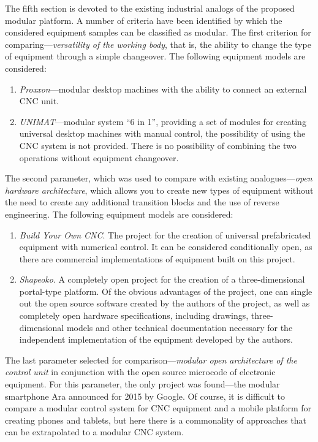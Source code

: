 The fifth section is devoted to the existing industrial analogs of the proposed modular platform. A number of criteria have been identified by which the considered equipment samples can be classified as modular. The first criterion for comparing---\textit{versatility of the working body}, that is, the ability to change the type of equipment through a simple changeover. The following equipment models are considered:

\begin{enumerate}
	\item\textit {Proxxon}---modular desktop machines with the ability to connect an external CNC unit.
	\item\textit{UNIMAT}---modular system ``6 in 1'', providing a set of modules for creating universal desktop machines with manual control, the possibility of using the CNC system is not provided. There is no possibility of combining the two operations without equipment changeover.
\end{enumerate}

The second parameter, which was used to compare with existing analogues---\textit{open hardware architecture}, which allows you to create new types of equipment without the need to create any additional transition blocks and the use of reverse engineering. The following equipment models are considered:

\begin{enumerate}
	\item\textit{Build Your Own CNC}. The project for the creation of universal prefabricated equipment with numerical control. It can be considered conditionally open, as there are commercial implementations of equipment built on this project.
	\item\textit{Shapeoko}. A completely open project for the creation of a three-dimensional portal-type platform. Of the obvious advantages of the project, one can single out the open source software created by the authors of the project, as well as completely open hardware specifications, including drawings, three-dimensional models and other technical documentation necessary for the independent implementation of the equipment developed by the authors.
\end{enumerate}

The last parameter selected for comparison---\textit{modular open architecture of the control unit} in conjunction with the open source microcode of electronic equipment. For this parameter, the only project was found---the modular smartphone Ara announced for 2015 by Google. Of course, it is difficult to compare a modular control system for CNC equipment and a mobile platform for creating phones and tablets, but here there is a commonality of approaches that can be extrapolated to a modular CNC system.

